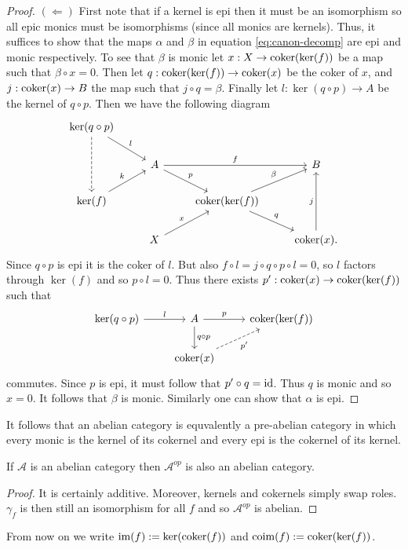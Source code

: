 \documentclass{memoir}
\begin{document}
\begin{proof}
    $(\Leftarrow)$ First note that if a kernel is epi then it must be an isomorphism so all epic monics must be isomorphisms (since all monics are kernels).
    Thus, it suffices to show that the maps $\alpha$ and $\beta$ in equation \ref{eq:canon-decomp} are epi and monic respectively.
    To see that $\beta$ is monic let $x:X\to \operatorname{coker}(\ker(f))$ be a map such that $\beta\circ x = 0$.
    Then let $q:\operatorname{coker}(\ker(f))\to\operatorname{coker}(x)$ be the coker of $x$, and $j:\operatorname{coker}(x)\to B$ the map such that $j\circ q = \beta$.
    Finally let $l:\ker(q\circ p)\to A$ be the kernel of $q\circ p$.
    Then we have the following diagram
    \begin{equation}
        \begin{tikzcd}
            \ker(q\circ p) \arrow[dr,"l"] \arrow[dd,dashed] & & & \\
            & A \arrow[rr,"f"] \arrow[dr,"p"] & & B \\
            \ker(f) \arrow[ru,"k"] & & \coker(\ker(f)) \arrow[dr,"q"] \arrow[ur,"\beta"] & \\
                               & X \arrow[ru,"x"] & & \coker(x). \arrow[uu,"j"]
        \end{tikzcd}
    \end{equation}
    Since $q\circ p$ is epi it is the coker of $l$.
    But also $f\circ l = j\circ q\circ p\circ l = 0$, so $l$ factors through $\ker(f)$ and so $p\circ l=0$.
    Thus there exists $p':\operatorname{coker}(x)\to\operatorname{coker}(\ker(f))$ such that
    \begin{equation}
        \begin{tikzcd}
            \ker(q\circ p) \arrow[r,"l"] & A \arrow[r,"p"] \arrow[d,"q\circ p"] & \coker(\ker(f)) \\
                                     & \coker(x) \arrow[ur,dashed,swap,"p'"]
        \end{tikzcd}
    \end{equation}
    commutes.
    Since $p$ is epi, it must follow that $p'\circ q = \operatorname{id}$.
    Thus $q$ is monic and so $x=0$.
    It follows that $\beta$ is monic.
    Similarly one can show that $\alpha$ is epi.
\end{proof}
It follows that an abelian category is equvalently a pre-abelian category in which every monic is the kernel of its cokernel and every epi is the cokernel of its kernel.
\begin{thm}
    If $\mathcal A$ is an abelian category then $\mathcal A^{op}$ is also an abelian category.
\end{thm}
\begin{proof}
    It is certainly additive.
    Moreover, kernels and cokernels simply swap roles.
    $\gamma_f$ is then still an isomorphism for all $f$ and so $\mathcal A^{op}$ is abelian.
\end{proof}
From now on we write $\operatorname{im}(f) := \ker(\operatorname{coker}(f))$ and $\operatorname{coim}(f) := \operatorname{coker}(\ker(f))$.
\end{document}
